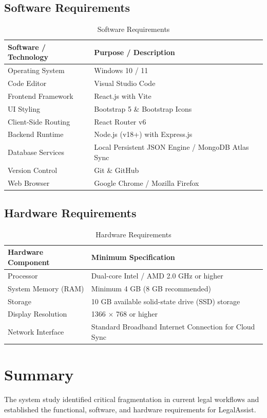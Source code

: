 \subsection{Software Requirements}
\begin{table}[h!]
    \centering
    \caption{Software Requirements}
    \label{tab:software_requirements}
    \begin{tabular}{p{5cm} p{9cm}}
        \toprule
        \textbf{Software / Technology} & \textbf{Purpose / Description} \\
        \midrule
        Operating System & Windows 10 / 11 \\
        Code Editor & Visual Studio Code \\
        Frontend Framework & React.js with Vite \\
        UI Styling & Bootstrap 5 \& Bootstrap Icons \\
        Client-Side Routing & React Router v6 \\
        Backend Runtime & Node.js (v18+) with Express.js \\
        Database Services & Local Persistent JSON Engine / MongoDB Atlas Sync \\
        Version Control & Git \& GitHub \\
        Web Browser & Google Chrome / Mozilla Firefox \\
        \bottomrule
    \end{tabular}
\end{table}

\subsection{Hardware Requirements}
\begin{table}[h!]
    \centering
    \caption{Hardware Requirements}
    \label{tab:hardware_requirements}
    \begin{tabular}{p{5cm} p{9cm}}
        \toprule
        \textbf{Hardware Component} & \textbf{Minimum Specification} \\
        \midrule
        Processor & Dual-core Intel / AMD 2.0 GHz or higher \\
        System Memory (RAM) & Minimum 4 GB (8 GB recommended) \\
        Storage & 10 GB available solid-state drive (SSD) storage \\
        Display Resolution & 1366 $\times$ 768 or higher \\
        Network Interface & Standard Broadband Internet Connection for Cloud Sync \\
        \bottomrule
    \end{tabular}
\end{table}

\section{Summary}
The system study identified critical fragmentation in current legal workflows and established the functional, software, and hardware requirements for LegalAssist.

\clearpage
